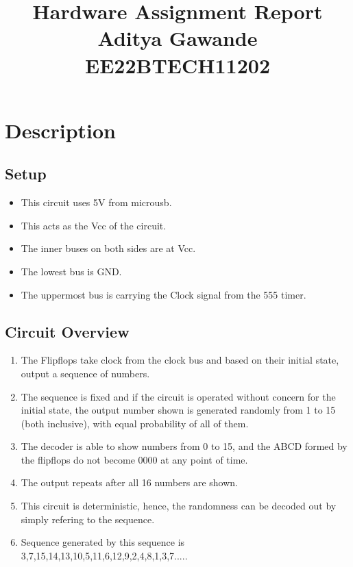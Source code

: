 \documentclass{article}
\begin{document}
\title{Hardware Assignment Report\\ \large{Aditya Gawande\\EE22BTECH11202}}
\author{}
\date{}
\maketitle

\maketitle

\section*{Description}

\subsection*{Setup}
\begin{itemize}
    \item This circuit uses 5V from microusb.
    \item This acts as the Vcc of the circuit. 
    \item The inner buses on both sides are at Vcc. 
    \item The lowest bus is GND. 
    \item The uppermost bus is carrying the Clock signal from the 555 timer.
\end{itemize}

\subsection*{Circuit Overview}
\begin{enumerate}
    \item The Flipflops take clock from the clock bus and based on their initial state, output a sequence of numbers.
    \item The sequence is fixed and if the circuit is operated without concern for the initial state, the output number shown is generated randomly from 1 to 15 (both inclusive), with equal probability of all of them.
    \item The decoder is able to show numbers from 0 to 15, and the ABCD formed by the flipflops do not become 0000 at any point of time.
    \item The output repeats after all 16 numbers are shown.
    \item This circuit is deterministic, hence, the randomness can be decoded out by simply refering to the sequence. 
    \item Sequence generated by this sequence is 3,7,15,14,13,10,5,11,6,12,9,2,4,8,1,3,7.....
\end{enumerate}
\end{document}
